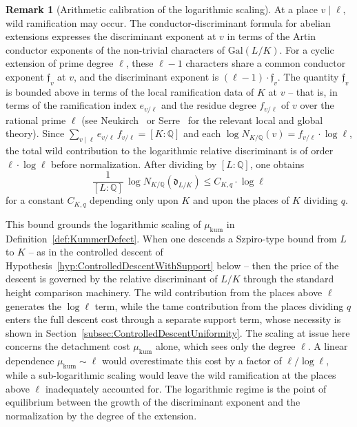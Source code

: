 \documentclass[10pt, reqno]{amsart}
\theoremstyle{plain}
\theoremstyle{definition}
\newtheorem{remark}[theorem]{Remark}
\theoremstyle{plain}
\newcommand{\Q}{\mathbb{Q}}
\begin{document}
\begin{remark}[Arithmetic calibration of the logarithmic scaling]
At a place $v \mid \ell$, wild ramification may occur. The conductor-discriminant formula for abelian extensions expresses the discriminant exponent at $v$ in terms of the Artin conductor exponents of the non-trivial characters of $\mathrm{Gal}(L/K)$. For a cyclic extension of prime degree $\ell$, these $\ell - 1$ characters share a common conductor exponent $\mathfrak{f}_v$ at $v$, and the discriminant exponent is $(\ell - 1) \cdot \mathfrak{f}_v$. The quantity $\mathfrak{f}_v$ is bounded above in terms of the local ramification data of $K$ at $v$ -- that is, in terms of the ramification index $e_{v/\ell}$ and the residue degree $f_{v/\ell}$ of $v$ over the rational prime $\ell$ (see Neukirch~\cite{Neukirch1999} or Serre~\cite{Serre1979} for the relevant local and global theory). Since $\sum_{v \mid \ell} e_{v/\ell} \, f_{v/\ell} = [K:\Q]$ and each $\log N_{K/\Q}(v) = f_{v/\ell} \cdot \log \ell$, the total wild contribution to the logarithmic relative discriminant is of order $\ell \cdot \log \ell$ before normalization. After dividing by $[L:\Q]$, one obtains
\begin{equation}\label{eq:KummerRelativeDiscriminant}
  \frac{1}{[L:\Q]}\,\log N_{K/\Q}(\mathfrak{d}_{L/K})
  \leq
  C_{K,q} \cdot \log \ell
\end{equation}
for a constant $C_{K,q}$ depending only upon $K$ and upon the places of $K$ dividing $q$.

This bound grounds the logarithmic scaling of $\mu_{\mathrm{kum}}$ in Definition~\ref{def:KummerDefect}. When one descends a Szpiro-type bound from $L$ to $K$ -- as in the controlled descent of Hypothesis~\ref{hyp:ControlledDescentWithSupport} below -- then the price of the descent is governed by the relative discriminant of $L/K$ through the standard height comparison machinery. The wild contribution from the places above $\ell$ generates the $\log \ell$ term, while the tame contribution from the places dividing $q$ enters the full descent cost through a separate support term, whose necessity is shown in Section~\ref{subsec:ControlledDescentUniformity}. The scaling at issue here concerns the detachment cost $\mu_{\mathrm{kum}}$ alone, which sees only the degree $\ell$. A linear dependence $\mu_{\mathrm{kum}} \sim \ell$ would overestimate this cost by a factor of $\ell / \log \ell$, while a sub-logarithmic scaling would leave the wild ramification at the places above $\ell$ inadequately accounted for. The logarithmic regime is the point of equilibrium between the growth of the discriminant exponent and the normalization by the degree of the extension.
\end{remark}
\end{document}
